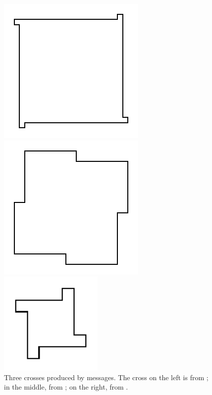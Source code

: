 \begin{figure}[!h]
\begin{minipage}[c]{.3\linewidth}
\includegraphics{Argcrossscr2.pdf}
\end{minipage}
\begin{minipage}[c]{.3\linewidth}
\includegraphics{Argcrossscr3}
\end{minipage}
\begin{minipage}[c]{.3\linewidth}
\includegraphics[width=5cm]{Argcrossscr4}
\end{minipage}
\label{c8croix1}
\caption{Three crosses produced by  messages. The cross on the left is from ; in the middle, from ; on the right, from . \label{fig:c8croix1}}
\end{figure}



